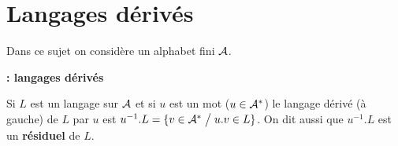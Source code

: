 \def\A{{\cal A}}
\chapter{Langages dérivés}
\thispagestyle{empty}
Dans ce sujet on considère un alphabet fini $\A$.
\begin{defin} {\bf : langages dérivés}


Si $L$ est un langage sur $\A$ et si $u$ est un mot ($u \in \A^{*}$) le langage dérivé (à gauche) de $L$ par $u$ est $u^{-1}.L = \{v \in \A^{*} \bigm/ u.v \in L\}$.
On dit aussi que $u^{-1}.L$ est un {\bf résiduel} de $L$.
\end{defin}
